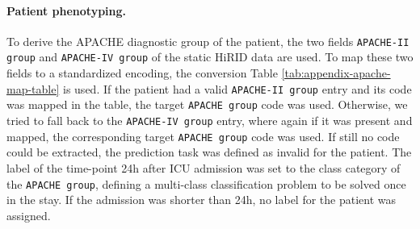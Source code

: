 \documentclass{article}
\begin{document}
\paragraph{Patient phenotyping.}
To derive the APACHE diagnostic group of the patient, the two fields \texttt{APACHE-II group} and \texttt{APACHE-IV group} of the static HiRID data are used. To map these two fields to a standardized encoding, the conversion Table \ref{tab:appendix-apache-map-table} is used. If the patient had a valid \texttt{APACHE-II group} entry and its code was mapped in the table, the target \texttt{APACHE group} code was used. Otherwise, we tried to fall back to the \texttt{APACHE-IV group} entry, where again if it was present and mapped, the corresponding target \texttt{APACHE group} code was used. If still no code could be extracted, the prediction task was defined as invalid for the patient. The label of the time-point 24h after ICU admission was set to the class category of the \texttt{APACHE group}, defining a multi-class classification problem to be solved once in the stay. If the admission was shorter than 24h, no label for the patient was assigned.
\end{document}
